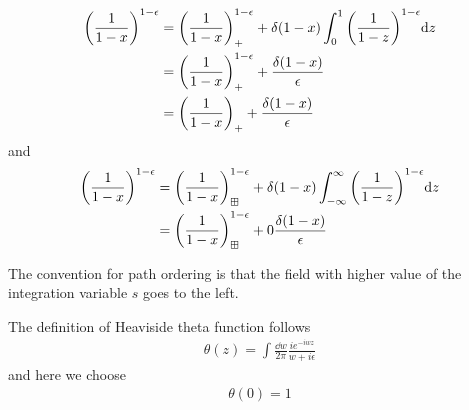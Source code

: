 \documentclass{article}
\begin{document}
\begin{align}
	\pqty{\frac{1}{1-x}}^{1-\epsilon}&=\pqty{\frac{1}{1-x}}^{1-\epsilon}_++\delta(1-x)\int_0^1\pqty{\frac{1}{1-z}}^{1-\epsilon}\dd z\\
	&=\pqty{\frac{1}{1-x}}^{1-\epsilon}_++\frac{\delta(1-x)}{\epsilon}\\
	&=\pqty{\frac{1}{1-x}}_++\frac{\delta(1-x)}{\epsilon}
\end{align}
and
\begin{align}
	\pqty{\frac{1}{1-x}}^{1-\epsilon}&=\pqty{\frac{1}{1-x}}^{1-\epsilon}_{\boxplus}+\delta(1-x)\int_{-\infty}^{\infty}\pqty{\frac{1}{1-z}}^{1-\epsilon}\dd z\\
	&=\pqty{\frac{1}{1-x}}^{1-\epsilon}_{\boxplus}+0\frac{\delta(1-x)}{\epsilon}\\
\end{align}

The convention for path ordering is that the field with higher value of the integration variable $s$ goes to the left.

The definition of Heaviside theta function follows
\begin{align}
	\theta(z)=\int\frac{\dd w}{2\pi}\frac{ie^{-iwz }}{w+i\epsilon}
\end{align}
and here we choose
\begin{align}
	\theta(0)=1
\end{align}

\clearpage
\end{document}
